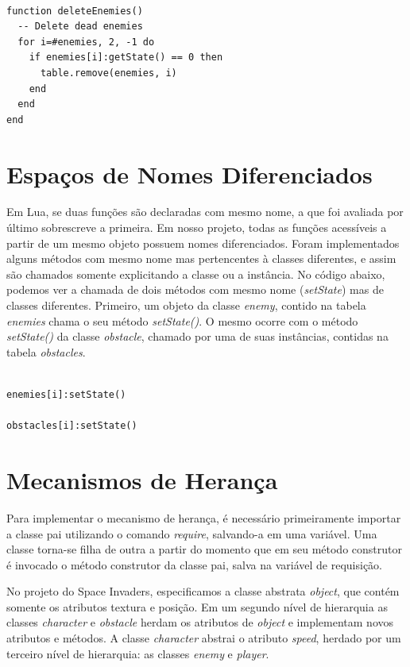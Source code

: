 \documentclass[rel_mlp]{iiufrgs}
\begin{document}
\clearpage

\begin{lstlisting}

function deleteEnemies()
  -- Delete dead enemies
  for i=#enemies, 2, -1 do
    if enemies[i]:getState() == 0 then
      table.remove(enemies, i)
    end
  end
end

\end{lstlisting}


\section{Espaços de Nomes Diferenciados} \label{Espaço}

Em Lua, se duas funções são declaradas com mesmo nome, a que foi avaliada por último sobrescreve a primeira. Em nosso projeto, todas as funções acessíveis a partir de um mesmo objeto possuem nomes diferenciados. Foram implementados alguns métodos com mesmo nome mas pertencentes à classes diferentes, e assim são chamados somente explicitando a classe ou a instância. No código abaixo, podemos ver a chamada de dois métodos com mesmo nome (\textit{setState}) mas de classes diferentes. Primeiro, um objeto da classe \textit{enemy}, contido na tabela \textit{enemies} chama o seu método \textit{setState()}. O mesmo ocorre com o método \textit{setState()} da classe \textit{obstacle}, chamado por uma de suas instâncias, contidas na tabela \textit{obstacles}.

\begin{lstlisting}

enemies[i]:setState()

obstacles[i]:setState()

\end{lstlisting}



\section{Mecanismos de Herança} \label{Herança}

Para implementar o mecanismo de herança, é necessário primeiramente importar a classe pai utilizando o comando \textit{require}, salvando-a em uma variável. Uma classe torna-se filha de outra a partir do momento que em seu método construtor é invocado o método construtor da classe pai, salva na variável de requisição. 

No projeto do Space Invaders, especificamos a classe abstrata \textit{object}, que contém somente os atributos textura e posição. Em um segundo nível de hierarquia as classes \textit{character} e \textit{obstacle} herdam os atributos de \textit{object} e implementam novos atributos e métodos. A classe \textit{character} abstrai o atributo \textit{speed}, herdado por um terceiro nível de hierarquia: as classes \textit{enemy} e \textit{player}.
\end{document}
